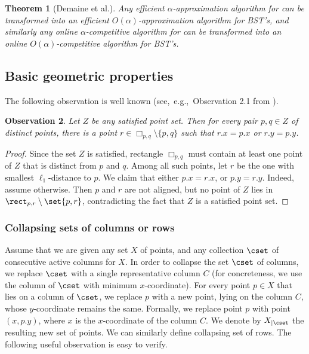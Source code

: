 \documentclass[11pt]{article}
\numberwithin{equation}{section}
\newtheorem{theorem}{Theorem}[section]
\theoremstyle{definition}
\theoremstyle{plain}
\newtheorem{myobs}[theorem]{Observation}
\begin{document}
%
\begin{theorem}[Demaine et al.]    %
Any efficient $\alpha$-approximation algorithm for \minsat can be transformed into an efficient $O(\alpha)$-approximation algorithm for BST's, and similarly any online $\alpha$-competitive algorithm for \minsat can be transformed into an online $O(\alpha)$-competitive algorithm for BST's. 
\end{theorem} 

%






	\subsection{Basic geometric properties }

	The following observation is well known (see,~e.g.,~Observation 2.1 from \cite{DHIKP09}). 
\begin{myobs}
        \label{obs: aligned point} 
        Let $Z$ be  any satisfied point set. Then for every pair $p,q \in Z$ of distinct points, there is a point $r \in \Box_{p,q} \setminus \{p,q\}$ such that $r.x = p.x$ or $r.y = p.y$. 
\end{myobs}
\begin{proof}
Since the set $Z$ is satisfied, rectangle $\Box_{p,q} $ must contain at least one point of $Z$ that is distinct from $p$ and $q$. Among all such points, let $r$ be the one with smallest $\ell_1$-distance to $p$. We claim that either $p.x=r.x$, or $p.y=r.y$. Indeed, assume otherwise. Then $p$ and $r$ are not aligned, but no point of $Z$ lies in $\rect_{p,r}\setminus\set{p,r}$, contradicting the fact that $Z$ is a satisfied point set.
\end{proof}



\subsubsection{Collapsing sets of columns or rows}
Assume that we are given any set $X$ of points, and any collection $\cset$ of consecutive active columns for $X$. 
In order to collapse the set $\cset$ of columns, we replace $\cset$ with a single representative column $C$ (for concreteness, we use the column of $\cset$ with minimum $x$-coordinate). 
For every point $p\in X$ that lies on a column of $\cset$, we replace $p$ with a new point, lying on the column $C$, whose $y$-coordinate remains the same.
Formally, we replace point $p$ with point $(x, p.y)$, where $x$ is the $x$-coordinate of the column $C$.  
We denote by $X_{|\cset}$ the resulting new set of points. We can similarly define collapsing set of rows. The following useful observation is easy to verify.%
\end{document}

